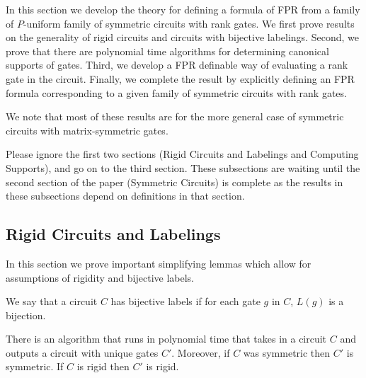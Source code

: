 \documentclass[../paper.tex]{subfiles}
\begin{document}
In this section we develop the theory for defining a formula of FPR from a
family of $P$-uniform family of symmetric circuits with rank gates. We first
prove results on the generality of rigid circuits and circuits with bijective
labelings. Second, we prove that there are polynomial time algorithms for
determining canonical supports of gates. Third, we develop a FPR definable way
of evaluating a rank gate in the circuit. Finally, we complete the result by
explicitly defining an FPR formula corresponding to a given family of symmetric
circuits with rank gates.

We note that most of these results are for the more general case of symmetric
circuits with matrix-symmetric gates.

\begin{remark}
  Please ignore the first two sections (Rigid Circuits and Labelings and
  Computing Supports), and go on to the third section. These subsections are
  waiting until the second section of the paper (Symmetric Circuits) is complete
  as the results in these subsections depend on definitions in that section.
\end{remark}

\subsection{Rigid Circuits and Labelings}

In this section we prove important simplifying lemmas which allow for
assumptions of rigidity and bijective labels.

\begin{definition}
  We say that a circuit $C$ has bijective labels if for each gate $g$ in $C$,
  $L(g)$ is a bijection.
\end{definition}

\begin{lem}
  \label{lem:bij_labels}
  There is an algorithm that runs in polynomial time that takes in a circuit $C$
  and outputs a circuit with unique gates $C'$. Moreover, if $C$ was symmetric
  then $C'$ is symmetric. If $C$ is rigid then $C'$ is rigid.
\end{lem}
\end{document}
